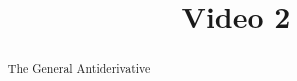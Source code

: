 \documentclass[handout]{ximera}
\title{Video 2}
\begin{document}
\begin{abstract}
The General Antiderivative
\end{abstract}

\maketitle

\end{document}
